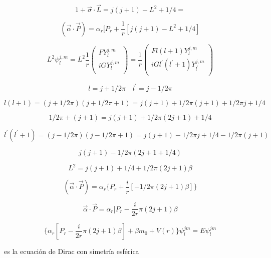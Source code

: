 \documentclass{report}
\begin{document}
\[1+ \overrightarrow{\sigma} \cdot \overrightarrow{L} = j(j+1) - L^2 +1/4 = \]

\[(\overrightarrow{\alpha} \cdot \overrightarrow{P}) = \alpha _r [P_r + \frac{1}{r} [j(j+1)-L^2 + 1/4]\]

\[L^2 \psi _{l}^{j,m} = L^2 \frac{1}{r} \left ( \begin{array}{cc}
 F Y_{l}^{j,m}   \\
 iG Y_{l}^{j,m}   \\
 \end{array} \right) = \frac{1}{r} \left ( \begin{array}{cc}
 F l (l+1) Y_{l}^{j,m}   \\
 iG l^{\prime} (l^{\prime}+1)Y_{l^{\prime}}^{j,m}   \\
 \end{array} \right)\]

\[l = j+1/2 \pi \quad l^{\prime} = j-1/2 \pi\]

\[l(l+1) = (j+1/2 \pi) (j+1/2 \pi + 1) = j (j+1) +1/2 \pi (j+1) + 1/2 \pi j +1/4\]

\begin{equation}
1/2 \pi + (j+1) = j(j+1) + 1/2 \pi (2j+1)+1/4
\end{equation}

\[l^{\prime}(l^{\prime}+1) = (j-1/2 \pi) (j-1/2 \pi + 1) = j (j+1) -1/2 \pi j + 1/4 -1/2 \pi (j +1)\]

\begin{equation}
j(j+1)-1/2 \pi (2j+1 + 1/4)
\end{equation}

\[L^2 = j (j+1)+1/4 +1/2 \pi (2j+1) \beta\]

\[(\overrightarrow{\alpha} \cdot \overrightarrow{P}) = \alpha _r \lbrace P_r + \frac{i}{r} [-1/2 \pi (2j+1) \beta] \rbrace\]

\[\overrightarrow{\alpha} \cdot \overrightarrow{P} = \alpha _r [P_r - \frac{i}{2r} \pi (2j + 1) \beta \]

\begin{equation}
\lbrace \alpha _r [P_r - \frac{i}{2r} \pi (2j+1) \beta] + \beta m_0 + V(r) \rbrace \psi _{l}^{jm} = E \psi _{l}^{jm}
\end{equation}

es la ecuación de Dirac con simetría esférica
\end{document}
